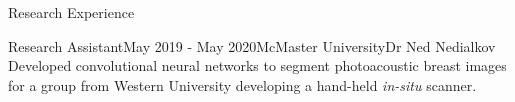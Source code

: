 \begin{rSection}{Research Experience}
\begin{rSubsection}{Research Assistant}{May 2019 - May 2020}{McMaster University}{Dr Ned Nedialkov}
	Developed convolutional neural networks to segment photoacoustic breast images for a group from Western University developing a hand-held \emph{in-situ} scanner.
\end{rSubsection}



\end{rSection}